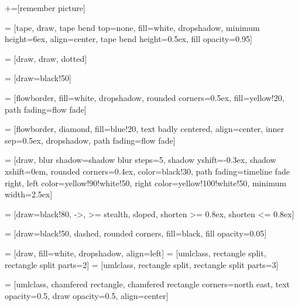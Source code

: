 +=[remember picture]

\newcommand\kernelred{black!20!red!100}

 = [tape, draw, tape bend top=none, fill=white,
                         dropshadow, minimum height=6ex, align=center,
                         tape bend height=0.5ex, fill opacity=0.95]

 = [draw, draw, dotted]


 = [draw=black!50]

 = [flowborder, fill=white, dropshadow,
                       rounded corners=0.5ex,
                       fill=yellow!20,
                       path fading=flow fade]

 = [flowborder, diamond, fill=blue!20,
                           text badly centered, align=center,
                           inner sep=0.5ex,
                           dropshadow, path fading=flow fade]


 = [draw,
                              blur shadow={shadow blur steps=5},
                              shadow yshift=-0.3ex, shadow xshift=0em,
                              rounded corners=0.4ex,
                              color=black!30,
                              path fading=timeline fade right,
                              left color=yellow!90!white!50,
                              right color=yellow!100!white!50,
                              minimum width=2.5ex]

 = [draw=black!80, ->, >= stealth, sloped,
                               shorten >= 0.8ex, shorten <= 0.8ex]

 = [draw=black!50, dashed,
                             rounded corners, fill=black, fill opacity=0.05]



  = [draw, fill=white, dropshadow, align=left]
 = [umlclass, rectangle split, rectangle split parts=2]
 = [umlclass, rectangle split, rectangle split parts=3]

 = [umlclass,
                       chamfered rectangle,
                       chamfered rectangle corners=north east,
                       text opacity=0.5, draw opacity=0.5, align=center]

